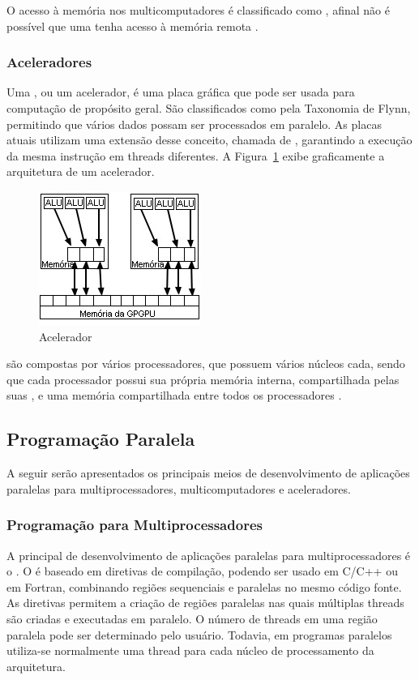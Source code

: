 O acesso à memória nos multicomputadores é classificado como \norma, afinal não é possível que uma \cpu tenha acesso à memória remota \cite{Hwang1998}.

\subsubsection{Aceleradores}

Uma \gpgpu, ou um acelerador, é uma placa gráfica que pode ser usada para computação de propósito geral. São classificados como \simd pela Taxonomia de Flynn, permitindo que vários dados possam ser processados em paralelo. As placas atuais utilizam uma extensão desse conceito, chamada de \simt, garantindo a execução da mesma instrução em threads diferentes. A Figura~\ref{fig:acel} exibe graficamente a arquitetura de um acelerador.

\begin{figure}[t]
    \centering
    \includegraphics{Images/gpgpu.jpg}
    \caption{Acelerador}\label{fig:acel}
\end{figure}

\gpgpus são compostas por vários processadores, que possuem vários núcleos cada, sendo que cada processador possui sua própria memória interna, compartilhada pelas suas \alus, e uma memória compartilhada entre todos os processadores \cite{Miranda2010}.

\subsection{Programação Paralela}

A seguir serão apresentados os principais meios de desenvolvimento de aplicações paralelas para multiprocessadores, multicomputadores e aceleradores.

\subsubsection{Programação para Multiprocessadores}

A principal \api de desenvolvimento de aplicações paralelas para multiprocessadores é o \openMP. O \openMP é baseado em diretivas de compilação, podendo ser usado em C/C++ ou em Fortran, combinando regiões sequenciais e paralelas no mesmo código fonte. As diretivas permitem a criação de regiões paralelas nas quais múltiplas threads são criadas e executadas em paralelo. O número de threads em uma região paralela pode ser determinado pelo usuário. Todavia, em programas paralelos utiliza-se normalmente uma thread para cada núcleo de processamento da arquitetura.

